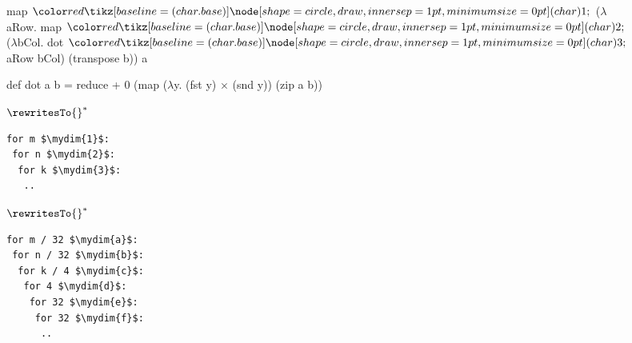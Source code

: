 \begin{figure}
  \begin{minipage}[t]{0.5\linewidth}\vspace{0pt}%
  \begin{minipage}{0.8\linewidth}
  \begin{rise}
map $\mydim{1}$ ($\lambda$aRow.
  map $\mydim{2}$ ($\lambda$bCol.
    dot $\mydim{3}$ aRow bCol)
    (transpose b)) a
    
def dot a b = reduce + 0
  (map ($\lambda$y. (fst y) $\times$ (snd y))
    (zip a b))
  \end{rise}%
  \end{minipage}%
  \begin{minipage}{0.2\linewidth}
  \hspace{1em}$ \rewritesTo{}^* $\hspace{1em}
  \end{minipage}%
\vspace{2em}
  \begin{minipage}{\linewidth}
  \begin{minipage}[t]{0.3\linewidth}\vspace{0pt}%
  \begin{lstlisting}[mathescape=true]
for m $\mydim{1}$:
 for n $\mydim{2}$:
  for k $\mydim{3}$:
   ..
  \end{lstlisting}
  \end{minipage}%
  \begin{minipage}[t]{0.2\linewidth}
  \vspace{1.5em}
  \hspace{1em}$ \rewritesTo{}^* $\hspace{1em}
  \end{minipage}%
  \begin{minipage}[t]{0.4\linewidth}\vspace{0pt}%
  \begin{lstlisting}[mathescape=true]
for m / 32 $\mydim{a}$: 
 for n / 32 $\mydim{b}$:
  for k / 4 $\mydim{c}$:
   for 4 $\mydim{d}$:
    for 32 $\mydim{e}$:
     for 32 $\mydim{f}$:
      ..
  \end{lstlisting}
  \end{minipage}
\end{minipage}
  \end{minipage}%
  \begin{minipage}[t]{0.5\linewidth}\vspace{0pt}%
  \begin{rise}

\end{rise}
\end{minipage}
\end{figure}
